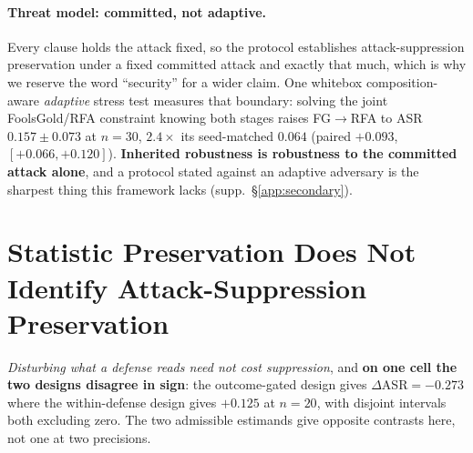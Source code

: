 \documentclass{article}
\begin{document}
\paragraph{Threat model: committed, not adaptive.} Every clause holds the attack fixed, so the protocol establishes attack-suppression preservation under a fixed committed attack and exactly that much, which is why we reserve the word ``security'' for a wider claim. One whitebox composition-aware \emph{adaptive} stress test measures that boundary: solving the joint FoolsGold/RFA constraint knowing both stages raises FG$\to$RFA to ASR $0.157 \pm 0.073$ at $n{=}30$, $2.4\times$ its seed-matched $0.064$ (paired $+0.093$, $[+0.066, +0.120]$). \textbf{Inherited robustness is robustness to the committed attack alone}, and a protocol stated against an adaptive adversary is the sharpest thing this framework lacks (supp.\ §\ref{app:secondary}).

\section{Statistic Preservation Does Not Identify Attack-Suppression Preservation}
\label{sec:targeted}

\emph{Disturbing what a defense reads need not cost suppression}, and \textbf{on one cell the two designs disagree in sign}: the outcome-gated design gives $\Delta$ASR${=}{-}0.273$ where the within-defense design gives $+0.125$ at $n{=}20$, with disjoint intervals both excluding zero. The two admissible estimands give opposite contrasts here, not one at two precisions.
\end{document}

